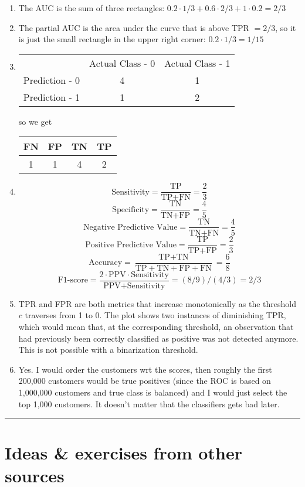 \documentclass[a4paper]{article}
\newcommand{\exinspo}
  {\color{black} \hrule \section{Ideas \& exercises from other sources}}
\begin{document}
{\begin{enumerate}
  \item The AUC is the sum of three rectangles: 
  $0.2 \cdot 1/3 + 0.6 \cdot 2/3 + 1\cdot 0.2 = 2/3$
  
  \item The partial AUC is the area under the curve that is above TPR $= 2/3$, 
  so it is just the small rectangle in the upper right corner: 
  $0.2 \cdot 1/3 = 1/15$ 
  
  \item   
  \begin{tabular}{ | c | c | c | } \hline
     & Actual Class - 0 & Actual Class - 1  \\
    Prediction - 0 & 4 & 1  \\
    Prediction - 1 & 1 & 2  \\ \hline
  \end{tabular}
  so we get
  \begin{tabular}{ | c | c | c | c | } \hline
    FN & FP & TN & TP   \\ \hline
    1 & 1 & 4 & 2 \\ \hline
  \end{tabular}
  
  \item   
  $$\text{Sensitivity} = \frac{\text{TP}}{\text{TP} + \text{FN}} =\frac{2}{3}$$
  $$\text{Specificity}  = \frac{\text{TN}}{\text{TN} + \text{FP}} =\frac{4}{5}$$
  $$\text{Negative Predictive Value} = \frac{\text{TN}}{\text{TN} + \text{FN}} 
  =\frac{4}{5} $$
  $$\text{Positive Predictive Value} = \frac{\text{TP}}{\text{TP} + \text{FP}} 
  =\frac{2}{3} $$
  $$\text{Accuracy} = \frac{\text{TP} + \text{TN}}{\text{TP} + \text{TN} + 
  \text{FP} + \text{FN}} =\frac{6}{8} $$
  $$\text{F1-score} = \frac{2\cdot\text{PPV}\cdot\text{Sensitivity}}{\text{PPV}
  +\text{Sensitivity}} = (8/ 9) / (4/3) = 2/3  $$
  
  \item TPR and FPR are both metrics that increase monotonically as the 
  threshold $c$ traverses from 1 to 0. The plot shows two instances of 
  diminishing TPR, which would mean that, at the corresponding threshold, an 
  observation that had previously been correctly classified as positive was not 
  detected anymore. This is not possible with a binarization threshold.
  
  \item Yes. I would order the customers wrt the scores, then roughly the first 
  200,000 customers would be true positives (since the ROC is based on 1,000,000 
  customers and true class is balanced) and I would just select the top 1,000 
  customers. It doesn't matter that the classifiers gets bad later.
  
\end{enumerate}

}


\dlz
\exinspo
\end{document}
